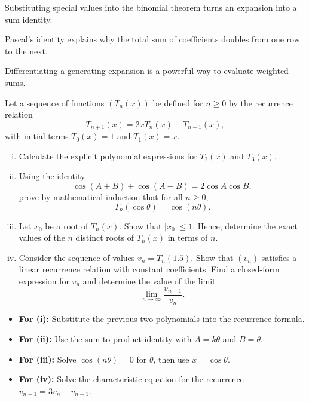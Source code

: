 \begin{takeaways}
\item Substituting special values into the binomial theorem turns an expansion into a sum identity.
\item Pascal's identity explains why the total sum of coefficients doubles from one row to the next.
\item Differentiating a generating expansion is a powerful way to evaluate weighted sums.
\end{takeaways}

\begin{problem}
Let a sequence of functions $(T_n(x))$ be defined for $n \ge 0$ by the recurrence relation
\[
T_{n+1}(x)=2xT_n(x)-T_{n-1}(x),
\]
with initial terms $T_0(x)=1$ and $T_1(x)=x$.

\begin{enumerate}[(i)]
\item Calculate the explicit polynomial expressions for $T_2(x)$ and $T_3(x)$.
\item Using the identity
\[
\cos(A+B)+\cos(A-B)=2\cos A\cos B,
\]
prove by mathematical induction that for all $n \ge 0$,
\[
T_n(\cos\theta)=\cos(n\theta).
\]
\item Let $x_0$ be a root of $T_n(x)$. Show that $|x_0|\le 1$. Hence, determine the exact values of the $n$ distinct roots of $T_n(x)$ in terms of $n$.
\item Consider the sequence of values $v_n=T_n(1.5)$. Show that $(v_n)$ satisfies a linear recurrence relation with constant coefficients. Find a closed-form expression for $v_n$ and determine the value of the limit
\[
\lim_{n\to\infty}\frac{v_{n+1}}{v_n}.
\]
\end{enumerate}
\end{problem}
\begin{hint}
\begin{itemize}
\item \textbf{For (i):} Substitute the previous two polynomials into the recurrence formula.
\item \textbf{For (ii):} Use the sum-to-product identity with $A=k\theta$ and $B=\theta$.
\item \textbf{For (iii):} Solve $\cos(n\theta)=0$ for $\theta$, then use $x=\cos\theta$.
\item \textbf{For (iv):} Solve the characteristic equation for the recurrence $v_{n+1}=3v_n-v_{n-1}$.
\end{itemize}
\end{hint}
